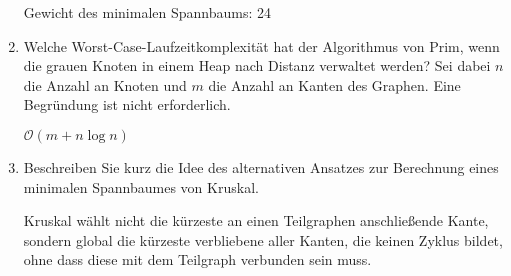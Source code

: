 \documentclass{bschlangaul-aufgabe}
\begin{document}
\begin{enumerate}
\begin{liAntwort}
\bigskip

Gewicht des minimalen Spannbaums: 24


\begin{center}
\end{center}
\end{liAntwort}


\item Welche Worst-Case-Laufzeitkomplexität hat der Algorithmus von
Prim, wenn die grauen Knoten in einem Heap nach Distanz verwaltet
werden? Sei dabei $n$ die Anzahl an Knoten und $m$ die Anzahl an Kanten
des Graphen. Eine Begründung ist nicht erforderlich.

\begin{liAntwort}
$\mathcal{O}(m + n \log n)$
\end{liAntwort}


\item Beschreiben Sie kurz die Idee des alternativen Ansatzes zur
Berechnung eines minimalen Spannbaumes von Kruskal.

\begin{liAntwort}
Kruskal wählt nicht die kürzeste an einen Teilgraphen anschließende
Kante, sondern global die kürzeste verbliebene aller Kanten, die keinen
Zyklus bildet, ohne dass diese mit dem Teilgraph verbunden sein muss.
\end{liAntwort}

\end{enumerate}
\end{document}
